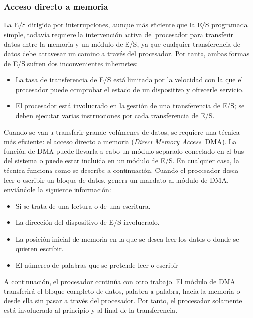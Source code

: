 \documentclass{article}
\begin{document}
						
						\subsubsection{Acceso directo a memoria}
							La E/S dirigida por interrupciones, aunque más eficiente que la E/S programada simple, todavía requiere la intervención activa del procesador para transferir datos entre la memoria y un módulo de E/S, ya que cualquier transferencia de datos debe atravesar un camino a través del procesador. Por tanto, ambas formas de E/S sufren dos inconvenientes inhernetes:
							
							\begin{itemize}
								\item La tasa de transferencia de E/S está limitada por la velocidad con la que el procesador puede comprobar el estado de un dispositivo y ofrecerle servicio.
								\item El procesador está involucrado en la gestión de una transferencia de E/S; se deben ejecutar varias instrucciones por cada transferencia de E/S.
							\end{itemize}
							
							Cuando se van a transferir grande volúmenes de datos, se requiere una técnica más eficiente: el acceso directo a memoria (\textit{Direct Memory Access}, DMA). La función de DMA puede llevarla a cabo un módulo separado conectado en el bus del sistema o puede estar incluida en un módulo de E/S. En cualquier caso, la técnica funciona como se describe a continuación. Cuando el procesador desea leer o escribir un bloque de datos, genera un mandato al módulo de DMA, enviándole la siguiente información:
							
							\begin{itemize}
								\item Si se trata de una lectura o de una escritura.
								\item La dirección del dispositivo de E/S involucrado.
								\item La posición inicial de memoria en la que se desea leer los datos o donde se quieren escribir.
								\item El númereo de palabras que se pretende leer o escribir
							\end{itemize}
							
							A continuación, el procesador continúa con otro trabajo. El módulo de DMA transferirá el bloque completo de datos, palabra a palabra, hacia la memoria o desde ella sin pasar a través del procesador. Por tanto, el procesador solamente está involucrado al principio y al final de la transferencia. \\
							
\end{document}

